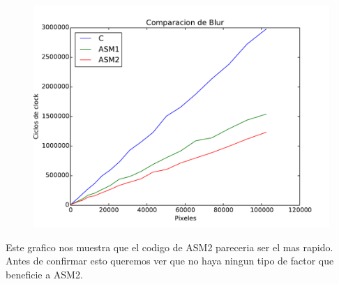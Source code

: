 \begin{figure}[h!]
	\centering
	\includegraphics[scale=0.5]{images/blur_comp}
\end{figure}

Este grafico nos muestra que el codigo de ASM2 pareceria ser el mas rapido. Antes de confirmar esto queremos ver que no haya ningun tipo de factor que beneficie a ASM2. \\

